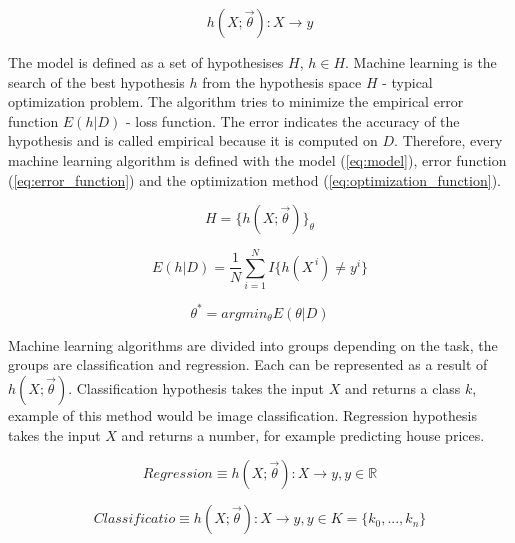 \documentclass[times, utf8, diplomski]{fer}
\begin{document}
\begin{equation} \label{eq:hypotesis}
	h(X ; \vec{\theta}) : X \to y
\end{equation}


The model is defined as a set of hypothesises $H$, $h \in H$. Machine learning is the search of the best hypothesis $h$ from the hypothesis space $H$ - typical optimization problem. The algorithm tries to minimize the empirical error function $E(h|D)$ - loss function. The error indicates the accuracy of the hypothesis and is called empirical because it is computed on $D$. Therefore, every machine learning algorithm is defined with the model (\ref{eq:model}), error function (\ref{eq:error_function}) and the optimization method (\ref{eq:optimization_function}).

\begin{equation} \label{eq:model}
	H = \{ h(X ; \vec{\theta}) \}_{\theta}
\end{equation}

\begin{equation} \label{eq:error_function}
	E(h|D) =  \frac{1}{N} \displaystyle\sum_{i=1}^{N} I\{h(X^{\,i}) \neq y^{i}\}
\end{equation}

\begin{equation} \label{eq:optimization_function}
	\theta^{*} = argmin_{\theta} E(\theta | D)
\end{equation}


Machine learning algorithms are divided into groups depending on the task, the groups are classification and regression. Each can be represented as a result of $h(X ; \vec{\theta})$. Classification hypothesis takes the input $X$ and returns a class $k$, example of this method would be image classification. Regression hypothesis takes the input $X$ and returns a number, for example predicting house prices.

\begin{equation} \label{eq:regression_def}
	Regression \equiv h(X ; \vec{\theta}) : X \to y, y \in \mathbb{R}
\end{equation}

\begin{equation} \label{eq:classification_def}
	Classificatio  \equiv h(X ; \vec{\theta}) : X \to y, y \in K = \{k_{0}, ..., k_{n}\}
\end{equation}
\end{document}
